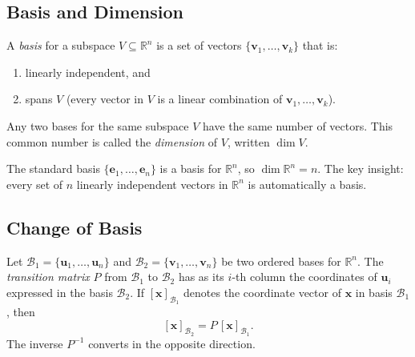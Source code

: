 \subsection{Basis and Dimension}

\begin{tcolorbox}[colback=propbox, colframe=propborder, arc=2pt,
  left=6pt, right=6pt, top=4pt, bottom=4pt,
  title={\small\textbf{Definition (Basis)}},
  fonttitle=\small\bfseries]
A \emph{basis} for a subspace $V \subseteq \mathbb{R}^n$ is a set of vectors
$\{\mathbf{v}_1, \ldots, \mathbf{v}_k\}$ that is:
\begin{enumerate}
  \item linearly independent, and
  \item spans $V$ (every vector in $V$ is a linear combination of $\mathbf{v}_1,\ldots,\mathbf{v}_k$).
\end{enumerate}
\end{tcolorbox}

\begin{tcolorbox}[colback=thmbox, colframe=thmborder, arc=2pt,
  left=6pt, right=6pt, top=4pt, bottom=4pt,
  title={\small\textbf{Theorem (Dimension is Well-Defined)}},
  fonttitle=\small\bfseries]
Any two bases for the same subspace $V$ have the same number of vectors.
This common number is called the \emph{dimension} of $V$, written $\dim V$.
\end{tcolorbox}

\begin{remark*}
The standard basis $\{\mathbf{e}_1, \ldots, \mathbf{e}_n\}$ is a basis for $\mathbb{R}^n$,
so $\dim \mathbb{R}^n = n$.
The key insight: every set of $n$ linearly independent vectors in $\mathbb{R}^n$ is
automatically a basis.
\end{remark*}

\subsection{Change of Basis}

\begin{tcolorbox}[colback=propbox, colframe=propborder, arc=2pt,
  left=6pt, right=6pt, top=4pt, bottom=4pt,
  title={\small\textbf{Definition (Transition Matrix)}},
  fonttitle=\small\bfseries]
Let $\mathcal{B}_1 = \{\mathbf{u}_1, \ldots, \mathbf{u}_n\}$ and
$\mathcal{B}_2 = \{\mathbf{v}_1, \ldots, \mathbf{v}_n\}$ be two ordered bases for $\mathbb{R}^n$.
The \emph{transition matrix} $P$ from $\mathcal{B}_1$ to $\mathcal{B}_2$ has
as its $i$-th column the coordinates of $\mathbf{u}_i$ expressed in the basis $\mathcal{B}_2$.
If $[\mathbf{x}]_{\mathcal{B}_1}$ denotes the coordinate vector of $\mathbf{x}$ in basis $\mathcal{B}_1$, then
\[
  [\mathbf{x}]_{\mathcal{B}_2} = P \,[\mathbf{x}]_{\mathcal{B}_1}.
\]
The inverse $P^{-1}$ converts in the opposite direction.
\end{tcolorbox}

